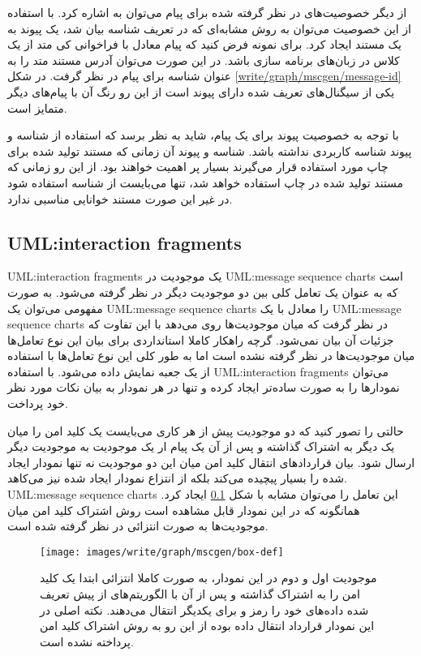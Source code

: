 از دیگر خصوصیت‌های در نظر گرفته شده برای پیام می‌توان به  اشاره کرد. با
استفاده از این خصوصیت می‌توان به روش مشابه‌ای که در تعریف شناسه بیان شد،  یک
پیوند به یک مستند ایجاد کرد. برای نمونه فرض کنید که پیام معادل با فراخوانی کی
متد از یک کلاس در زبان‌های برنامه سازی باشد. در این صورت می‌توان آدرس مستند متد
را به عنوان شناسه برای پیام در نظر گرفت. در شکل
\ref{write/graph/mscgen/message-id} یکی از سیگنال‌های تعریف شده دارای پیوند است
از این رو رنگ آن با پیام‌های دیگر متمایز است.

\begin{note}
با توجه به خصوصیت پیوند برای یک پیام، شاید به نظر برسد که استفاده از شناسه و
پیوند شناسه کاربردی نداشته باشد. شناسه و پیوند آن زمانی که مستند تولید شده برای
چاپ مورد استفاده قرار می‌گیرند بسیار پر اهمیت خواهند بود. از این رو زمانی که
مستند تولید شده در چاپ استفاده خواهد شد، تنها می‌بایست از شناسه استفاده شود در
غیر این صورت مستند خوانایی مناسبی ندارد.
\end{note}

\subsection{\glspl{UML:interaction fragment}}

\glspl{UML:interaction fragment} یک موجودیت در \glspl{UML:message sequence chart}
است که به عنوان یک تعامل کلی بین دو موجودیت‌ دیگر در نظر گرفته می‌شود. به صورت
مفهومی می‌توان یک \glspl{UML:message sequence chart} را معادل با یک
\glspl{UML:message sequence chart} در نظر گرفت که میان موجودیت‌ها روی می‌دهد با
این تفاوت که جزئیات آن بیان نمی‌شود. گرچه راهکار کاملا استانداردی برای بیان این
نوع تعامل‌ها میان موجودیت‌ها در نظر گرفته نشده است اما به طور کلی این نوع
تعامل‌ها با استفاده از یک جعبه نمایش داده می‌شود. با استفاده
\glspl{UML:interaction fragment} می‌توان نمودارها را به صورت ساده‌تر ایجاد کرده
و تنها در هر نمودار به بیان نکات مورد نظر خود پرداخت.

حالتی را تصور کنید که دو موجودیت پیش از هر کاری می‌بایست یک کلید امن را میان یک
دیگر به اشتراک گذاشته و پس از آن یک پیام ار یک موجودیت به موجودیت دیگر ارسال
شود. بیان قراردادهای انتقال کلید امن میان این دو موجودیت نه تنها نمودار ایجاد
شده را بسیار پیچیده می‌کند بلکه از انتزاع نمودار ایجاد شده نیز می‌کاهد.
\glspl{UML:message sequence chart} این تعامل را می‌توان مشابه با شکل \ref{}
ایجاد کرد. همانگونه که در این نمودار قابل مشاهده است روش اشتراک کلید امن میان
موجودیت‌ها به صورت انتزائی در نظر گرفته شده است.


\begin{figure}[h]
\centering
\texttt{[image: images/write/graph/mscgen/box-def]}
\caption[تعامل موجودیت‌ها برای اشتراک کلید امن]{
	موجودیت اول و دوم در این نمودار، به صورت کاملا انتزائی ابتدا یک کلید امن را به
	اشتراک گذاشته و پس از آن با الگوریتم‌های از پیش تعریف شده داده‌های خود را رمز و
	برای یکدیگر انتقال می‌دهند. نکته اصلی در این نمودار قرارداد انتقال داده بوده از
	این رو به روش اشتراک کلید امن پرداخته نشده است.
	}
\label{write/graph/mscgen/box-def}
\end{figure}


